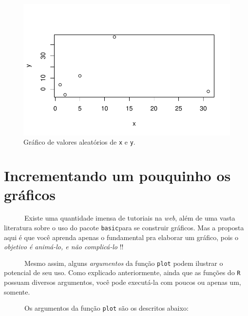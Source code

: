 \documentclass[
  letterpaper,
  DIV=11,
  numbers=noendperiod]{scrreprt}
\begin{document}
\begin{figure}[H]

{\centering \includegraphics{basico_files/figure-pdf/unnamed-chunk-6-1.pdf}

}

\caption{Gráfico de valores aleatórios de \texttt{x} e \texttt{y}.}

\end{figure}%

\section{Incrementando um pouquinho os
gráficos}\label{incrementando-um-pouquinho-os-gruxe1ficos}

~~~~~~Existe uma quantidade imensa de tutoriais na \emph{web}, além de
uma vasta literatura sobre o uso do pacote \texttt{basic}para se
construir gráficos. Mas a proposta aqui é que você aprenda apenas o
fundamental pra elaborar um gráfico, pois o \emph{objetivo é animá-lo, e
não complicá-lo} !!

~~~~~~Mesmo assim, alguns \emph{argumentos} da função \texttt{plot}
podem ilustrar o potencial de seu uso. Como explicado anteriormente,
ainda que as funções do \texttt{R} possuam diversos argumentos, você
pode executá-la com poucos ou apenas um, somente.

~~~~~~Os argumentos da função \texttt{plot} são os descritos abaixo:
\end{document}
